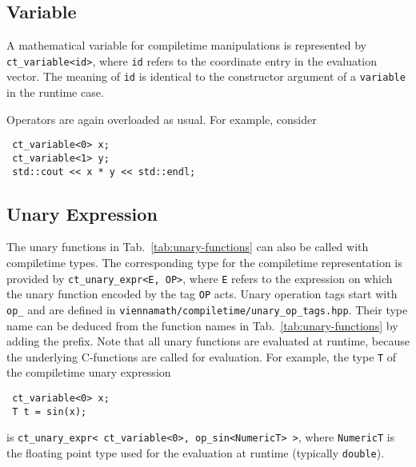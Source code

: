 
 \subsection{Variable}
A mathematical variable for compiletime manipulations is represented by \lstinline|ct_variable<id>|, where \lstinline|id| refers to the coordinate entry in the evaluation vector.
The meaning of \lstinline|id| is identical to the constructor argument of a \lstinline|variable| in the runtime case. 

Operators are again overloaded as usual. For example, consider
\begin{lstlisting}
 ct_variable<0> x;
 ct_variable<1> y;
 std::cout << x * y << std::endl;
\end{lstlisting}


 \subsection{Unary Expression}
The unary functions in Tab.~\ref{tab:unary-functions} can also be called with compiletime types.
The corresponding type for the compiletime representation is provided by \lstinline|ct_unary_expr<E, OP>|, where \lstinline|E| refers to the expression on which the unary function encoded by the tag \lstinline|OP| acts.
Unary operation tags start with \lstinline|op_| and are defined in \lstinline|viennamath/compiletime/unary_op_tags.hpp|. Their type name can be deduced from the function names in Tab.~\ref{tab:unary-functions} by adding the prefix.
Note that all unary functions are evaluated at runtime, because the underlying C-functions are called for evaluation. 
For example, the type \lstinline|T| of the compiletime unary expression
\begin{lstlisting}
 ct_variable<0> x;
 T t = sin(x);
\end{lstlisting}
is \lstinline|ct_unary_expr< ct_variable<0>, op_sin<NumericT> >|, where \lstinline|NumericT| is the floating point type used for the evaluation at runtime (typically \lstinline|double|).



